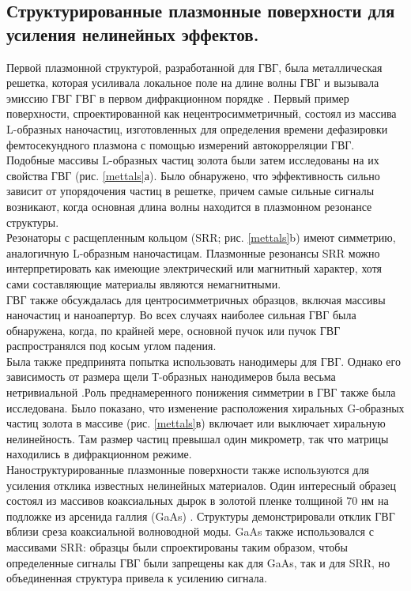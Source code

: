 \subsection*{Структурированные плазмонные поверхности для усиления нелинейных эффектов.}
\hspace*{2mm}
Первой плазмонной структурой, разработанной для ГВГ, была металлическая решетка, которая усиливала локальное поле на длине волны ГВГ и вызывала эмиссию ГВГ ГВГ в первом дифракционном порядке \cite{grosse2012nonlinear}. 
Первый пример поверхности, спроектированной как нецентросимметричный, состоял из массива L-образных наночастиц, изготовленных для определения времени дефазировки фемтосекундного плазмона с помощью измерений автокорреляции ГВГ. Подобные массивы L-образных частиц золота были затем исследованы на их свойства ГВГ (рис. \ref{mettals}а). Было обнаружено, что эффективность сильно зависит от упорядочения частиц в решетке, причем самые сильные сигналы возникают, когда основная длина волны находится в плазмонном резонансе структуры.
\\
\hspace*{2mm}
Резонаторы с расщепленным кольцом \cite{linden2012collective} (SRR; рис. \ref{mettals}b) имеют симметрию, аналогичную L-образным наночастицам. Плазмонные резонансы SRR можно интерпретировать как имеющие электрический или магнитный характер, хотя сами составляющие материалы являются немагнитными. 
\\
\hspace*{2mm}
ГВГ также обсуждалась для центросимметричных образцов, включая массивы наночастиц \cite{mcmahon2006second} и наноапертур. Во всех случаях наиболее сильная ГВГ была обнаружена, когда, по крайней мере, основной пучок или пучок ГВГ распространялся под косым углом падения.
\\
\hspace*{2mm}
Была также предпринята попытка использовать нанодимеры для ГВГ. Однако его зависимость от размера щели Т-образных нанодимеров была весьма нетривиальной \cite{canfield2007local}.Роль преднамеренного понижения симметрии в ГВГ также была исследована. Было показано, что изменение расположения хиральных G-образных частиц золота в массиве (рис. \ref{mettals}в) включает или выключает хиральную нелинейность. Там размер частиц превышал один микрометр, так что матрицы находились в дифракционном режиме. 
\\
\hspace*{2mm}
Наноструктурированные плазмонные поверхности также используются для усиления отклика известных нелинейных материалов. Один интересный образец состоял из массивов коаксиальных дырок в золотой пленке толщиной 70 нм на подложке из арсенида галлия (GaAs)  \cite{fan2006second}. Структуры демонстрировали отклик ГВГ вблизи среза коаксиальной волноводной моды. GaAs также использовался с массивами SRR: образцы были спроектированы таким образом, чтобы определенные сигналы ГВГ были запрещены как для GaAs, так и для SRR, но объединенная структура привела к усилению сигнала. 
